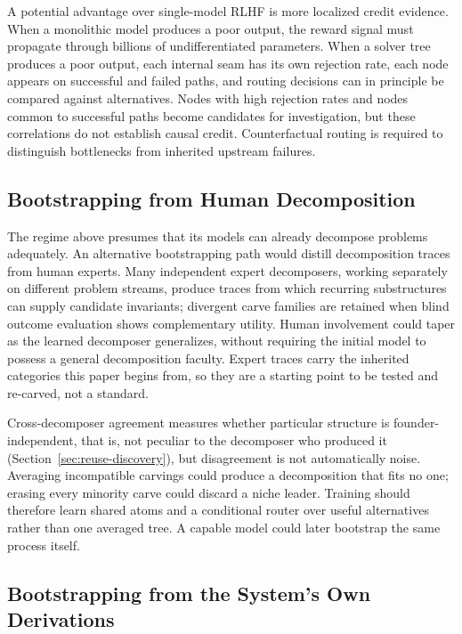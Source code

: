 \documentclass[11pt]{article}
\begin{document}
A potential advantage over single-model RLHF is more localized credit evidence. When a monolithic model produces a poor output, the reward signal must propagate through billions of undifferentiated parameters. When a solver tree produces a poor output, each internal seam has its own rejection rate, each node appears on successful and failed paths, and routing decisions can in principle be compared against alternatives. Nodes with high rejection rates and nodes common to successful paths become candidates for investigation, but these correlations do not establish causal credit. Counterfactual routing is required to distinguish bottlenecks from inherited upstream failures.

\subsection{Bootstrapping from Human Decomposition}
\label{sec:human-bootstrap}

The regime above presumes that its models can already decompose problems adequately. An alternative bootstrapping path would distill decomposition traces from human experts. Many independent expert decomposers, working separately on different problem streams, produce traces from which recurring substructures can supply candidate invariants; divergent carve families are retained when blind outcome evaluation shows complementary utility. Human involvement could taper as the learned decomposer generalizes, without requiring the initial model to possess a general decomposition faculty. Expert traces carry the inherited categories this paper begins from, so they are a starting point to be tested and re-carved, not a standard.

Cross-decomposer agreement measures whether particular structure is founder-independent, that is, not peculiar to the decomposer who produced it (Section~\ref{sec:reuse-discovery}), but disagreement is not automatically noise. Averaging incompatible carvings could produce a decomposition that fits no one; erasing every minority carve could discard a niche leader. Training should therefore learn shared atoms and a conditional router over useful alternatives rather than one averaged tree. A capable model could later bootstrap the same process itself.

\subsection{Bootstrapping from the System's Own Derivations}
\label{sec:self-bootstrap}
\end{document}
